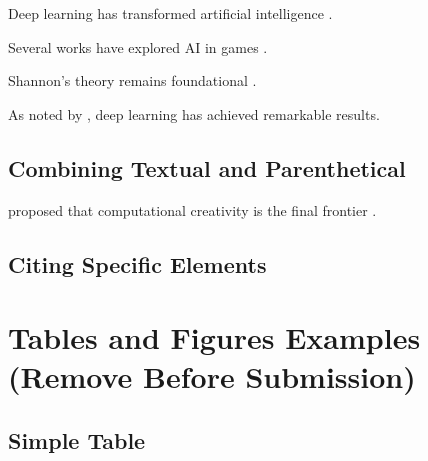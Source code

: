 Deep learning has transformed artificial intelligence \parencite{lecun2015deep}.

Several works have explored AI in games \parencite{mnih2015atari, yannakakis2018game}.

Shannon's theory remains foundational \parencite[see][pp. 379--383]{shannon1948mathematical}.

As noted by \textcite[p.~436]{lecun2015deep}, deep learning has achieved remarkable results.

\subsection*{Combining Textual and Parenthetical}

\textcite{colton2012creativity} proposed that computational creativity is the final frontier
\parencite[p.~22]{colton2012creativity}.

\subsection*{Citing Specific Elements}

\parencite[p.~45]{pressman2014software}

\parencite[Chapter~3]{knuth1997art}

\parencite[Figure~1]{goodfellow2016generative}

\parencite{artificial2020intelligence}



\section*{Tables and Figures Examples (Remove Before Submission)}

\subsection*{Simple Table}

